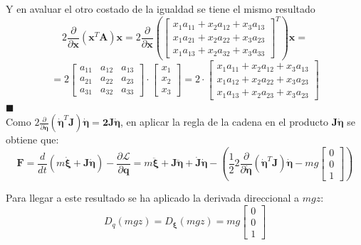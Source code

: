 \documentclass[twoside,11pt]{book}
\begin{document}
Y en avaluar el otro costado de la igualdad se tiene el mismo resultado
\begin{equation}
2 \frac{\partial}{\partial \pmb{x}}(\pmb{x}^{T}\pmb{A})\pmb{x}=2 \frac{\partial}{\partial \pmb{x}} \left( \left[ \begin{array}{ccc}
x_1a_{11}+x_2a_{12}+x_3a_{13} \\
x_1a_{21}+x_2a_{22}+x_3a_{23} \\
x_1a_{13}+x_2a_{32}+x_3a_{33}
\end{array} \right]^{T} \right)\pmb{x}=
\end{equation}
\begin{equation}
=2\left[\begin{array}{ccc}
a_{11} & a_{12} & a_{13} \\
a_{21} & a_{22} & a_{23} \\
a_{31} & a_{32} & a_{33} 
\end{array} \right]\cdot\left[\begin{array}{c}
x_1 \\
x_2 \\
x_3
\end{array} \right]=2\cdot\left[ \begin{array}{c}
x_1a_{11}+x_2a_{12}+x_3a_{13} \\
x_1a_{12}+x_2a_{22}+x_3a_{23} \\
x_1a_{13}+x_2a_{23}+x_3a_{23}
\end{array} \right]
\end{equation}
\hfill $\blacksquare$ \\
Como $2 \frac{\partial}{\partial \pmb{\dot{\eta}}}(\pmb{\dot{\eta}}^{T}\pmb{J})\pmb{\dot{\eta}=2} \pmb{J} \pmb{\dot{\eta}}$, en aplicar la regla de la cadena en el producto $\pmb{J}\pmb{\dot{\eta}}$ se obtiene que:
\begin{equation}
\pmb{F}=\frac{d}{dt}\left(m \dot{\pmb{\xi}}+\pmb{J} \pmb{\dot{\eta}}\right)-\frac{\partial \mathcal{L}}{\partial \pmb{q}} =m\pmb{\ddot{\xi}} + \pmb{J}\pmb{\ddot{\eta}} + \pmb{\dot{J}}\pmb{\dot{\eta}}-\left( \frac{1}{2} 2 \frac{\partial}{\partial \pmb{\dot{\eta}}} ( \pmb{\dot{\eta}}^{T}\pmb{J})\pmb{\dot{\eta}} - mg\left[\begin{array}{c}
0 \\
0 \\
1
\end{array} \right] \right)
\end{equation}

Para llegar a este resultado se ha aplicado la derivada direccional a $mgz$:
\begin{equation}
D_q(mgz)=D_{\pmb{\xi}}(mgz)=mg \left[ \begin{array}{c}
0 \\
0 \\
1
\end{array} \right]
\end{equation}
\end{document}

